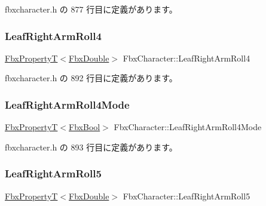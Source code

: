  fbxcharacter.\+h の 877 行目に定義があります。

\mbox{\label{class_fbx_character_ac95f0fafee5ee51e4be50954de0d0876}} 
\subsubsection{\texorpdfstring{Leaf\+Right\+Arm\+Roll4}{LeafRightArmRoll4}}
{\footnotesize\ttfamily \hyperlink{class_fbx_property_t}{Fbx\+PropertyT}$<$\hyperlink{fbxtypes_8h_a171e72a1c46fc15c1a6c9c31948c1c5b}{Fbx\+Double}$>$ Fbx\+Character\+::\+Leaf\+Right\+Arm\+Roll4}



 fbxcharacter.\+h の 892 行目に定義があります。

\mbox{\label{class_fbx_character_afaeb5a33929f72707cce2bc030edc837}} 
\subsubsection{\texorpdfstring{Leaf\+Right\+Arm\+Roll4\+Mode}{LeafRightArmRoll4Mode}}
{\footnotesize\ttfamily \hyperlink{class_fbx_property_t}{Fbx\+PropertyT}$<$\hyperlink{fbxtypes_8h_a92e0562b2fe33e76a242f498b362262e}{Fbx\+Bool}$>$ Fbx\+Character\+::\+Leaf\+Right\+Arm\+Roll4\+Mode}



 fbxcharacter.\+h の 893 行目に定義があります。

\mbox{\label{class_fbx_character_a31a5a731e57e9495d2c3e3463cb81328}} 
\subsubsection{\texorpdfstring{Leaf\+Right\+Arm\+Roll5}{LeafRightArmRoll5}}
{\footnotesize\ttfamily \hyperlink{class_fbx_property_t}{Fbx\+PropertyT}$<$\hyperlink{fbxtypes_8h_a171e72a1c46fc15c1a6c9c31948c1c5b}{Fbx\+Double}$>$ Fbx\+Character\+::\+Leaf\+Right\+Arm\+Roll5}



